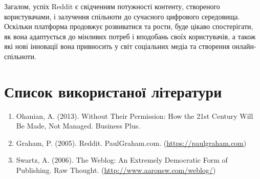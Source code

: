 \documentclass[oneside,14pt]{extarticle}
\begin{document}
Загалом, успіх Reddit є свідченням потужності контенту, створеного користувачами, і залучення спільноти до сучасного цифрового середовища. Оскільки платформа продовжує розвиватися та рости, буде цікаво спостерігати, як вона адаптується до мінливих потреб і вподобань своїх користувачів, а також які нові інновації вона привносить у світ соціальних медіа та створення онлайн-спільноти.

\newpage
\section*{Список використаної літератури}
\begin{enumerate}
	\item Ohanian, A. (2013). Without Their Permission: How the 21st Century Will Be Made, Not Managed. Business Plus.
\item Graham, P. (2005). Reddit. PaulGraham.com. (\href{https://PaulGraham.com}{https://paulgraham.com})
\item Swartz, A. (2006). The Weblog: An Extremely Democratic Form of Publishing. Raw Thought. (\href{http://www.aaronsw.com/weblog/}{http://www.aaronsw.com/weblog/})
\end{enumerate}
\end{document}
